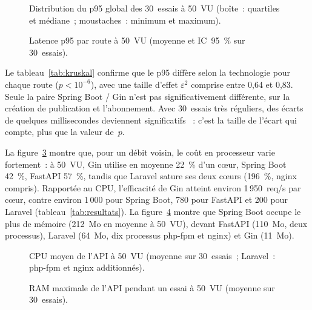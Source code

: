 \documentclass[conference,a4paper]{IEEEtran}
\begin{document}
\begin{figure}[htbp]
\centering

\caption{Distribution du p95 global des 30~essais à 50~VU (boîte~:
quartiles et médiane~; moustaches~: minimum et maximum).}
\label{fig:box}
\end{figure}

\begin{figure}[htbp]
\centering

\caption{Latence p95 par route à 50~VU (moyenne et IC~95~\% sur
30~essais).}
\label{fig:routes}
\end{figure}

Le tableau~\ref{tab:kruskal} confirme que le p95 diffère selon la
technologie pour chaque route ($p < 10^{-6}$), avec une taille d'effet
$\varepsilon^2$ comprise entre 0,64 et 0,83. Seule la paire
Spring Boot / Gin n'est pas significativement différente, sur la
création de publication et l'abonnement. Avec 30~essais très réguliers,
des écarts de quelques millisecondes deviennent
\og significatifs \fg~: c'est la taille de l'écart qui compte, plus que
la valeur de~$p$.

\begin{table}[htbp]
\caption{Test de Kruskal-Wallis sur le p95 à 50~VU (Mann-Whitney et
correction de Holm pour les paires, $\alpha = 0{,}05$)}
\label{tab:kruskal}
\centering

\end{table}

La figure~\ref{fig:cpu} montre que, pour un débit voisin, le coût en
processeur varie fortement~: à 50~VU, Gin utilise en moyenne 22~\%
d'un cœur, Spring Boot 42~\%, FastAPI 57~\%, tandis que Laravel
sature ses deux cœurs (196~\%, nginx compris). Rapportée au CPU,
l'efficacité de Gin atteint environ 1\,950~req/s par cœur, contre
environ 1\,000 pour Spring Boot, 780 pour FastAPI et 200 pour Laravel
(tableau~\ref{tab:resultats}). La figure~\ref{fig:ram} montre que
Spring Boot occupe le plus de mémoire (212~Mo en moyenne à 50~VU),
devant FastAPI (110~Mo, deux processus), Laravel (64~Mo, dix processus
php-fpm et nginx) et Gin (11~Mo).

\begin{figure}[htbp]
\centering

\caption{CPU moyen de l'API à 50~VU (moyenne sur 30~essais~; Laravel~:
php-fpm et nginx additionnés).}
\label{fig:cpu}
\end{figure}

\begin{figure}[htbp]
\centering

\caption{RAM maximale de l'API pendant un essai à 50~VU (moyenne sur
30~essais).}
\label{fig:ram}
\end{figure}
\end{document}
